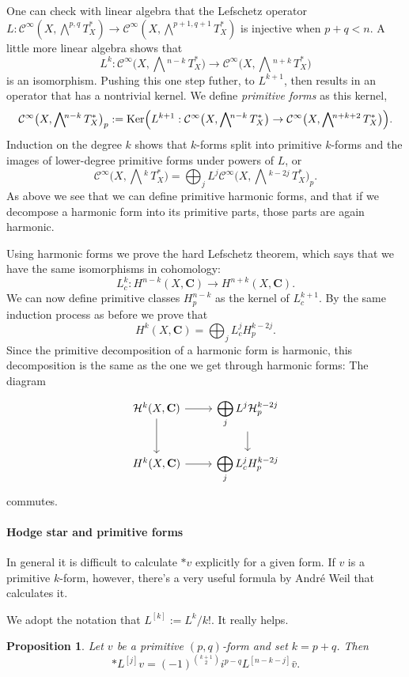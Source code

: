 \documentclass[11pt]{article}
\newtheorem{prop}[theo]{Proposition}
\theoremstyle{definition}
\newcommand{\cc}[1]{\mathcal{#1}}
\def\^#1{^{[#1]}}
\def\bw#1{\bigwedge\!\!{}^{#1}\, T_X^*}
\def\CC{\mathbf{C}}
\def\HH{\mathcal{H}}
\DeclareMathOperator{\Ker}{Ker}
\begin{document}
One can check with linear algebra that the Lefschetz operator $L : \cc C^\infty(X, \bigwedge^{p,q}T_X^*) \to \cc C^\infty(X, \bigwedge^{p+1,q+1} T_X^*)$ is injective when $p+q < n$.
A little more linear algebra shows that
\[
L^{k} : \cc C^\infty\bigl(X, \bw {n-k}\bigr) \to \cc C^\infty\bigl(X, \bw{n+k}\bigr)
\]
is an isomorphism.
Pushing this one step futher, to $L^{k+1}$, then results in an operator that has a nontrivial kernel.
We define \emph{primitive forms} as this kernel,
\[
\cc C^\infty\bigl(X, \bw {n-k}\bigr)_p := \Ker\Bigl( 
L^{k+1} : \cc C^\infty\bigl(X, \bw {n-k}\bigr) \to \cc C^\infty\bigl(X, \bw{n+k+2}\bigr)
\Bigr).
\]
Induction on the degree $k$ shows that $k$-forms split into primitive $k$-forms and the images of lower-degree primitive forms under powers of $L$, or
\[
\cc C^\infty\bigl(X, \bw {k}\bigr)
= \bigoplus_{j} L^j \cc C^\infty\bigl(X, \bw {k-2j}\bigr)_p.
\]
As above we see that we can define primitive harmonic forms, and that if we decompose a harmonic form into its primitive parts, those parts are again harmonic.

Using harmonic forms we prove the hard Lefschetz theorem, which says that we have the same isomorphisms in cohomology:
\[
L_c^k : H^{n-k}(X, \CC) \to H^{n+k}(X,\CC).
\]
We can now define primitive classes $H^{n-k}_p$ as the kernel of $L_c^{k+1}$.
By the same induction process as before we prove that
\[
H^k(X,\CC) = \bigoplus_j L_c^j H^{k-2j}_p.
\]
Since the primitive decomposition of a harmonic form is harmonic, this decomposition is the same as the one we get through harmonic forms:
The diagram
\[
\begin{tikzcd}
\HH^k(X,\CC) \ar[r] \ar[d] &
\displaystyle\bigoplus_j L^j \HH^{k-2j}_p \ar[d]
\\
H^k(X,\CC) \ar[r] &
\displaystyle\bigoplus_j L_c^j H^{k-2j}_p
\end{tikzcd}
\]
commutes.


\paragraph{Hodge star and primitive forms}

In general it is difficult to calculate $*v$ explicitly for a given form.
If $v$ is a primitive $k$-form, however, there's a very useful formula by Andr\'e Weil that calculates it.

We adopt the notation that $L\^k := L^k / k!$.
It really helps.

\begin{prop}
Let $v$ be a primitive $(p,q)$-form and set $k = p+q$.
Then
\[
* L\^j v
= (-1)^{\binom{k+1}{2}} i^{p-q} L\^{n-k-j} \bar v.
\]
\end{prop}
\end{document}
